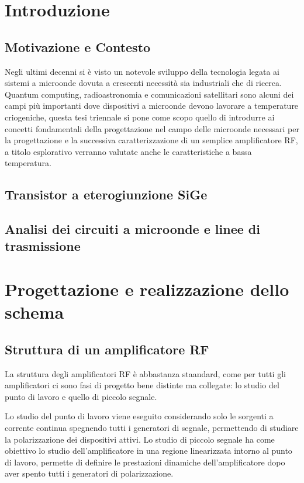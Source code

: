 \documentclass[12pt]{article}
\begin{document}
\section{Introduzione}
\subsection{Motivazione e Contesto}
Negli ultimi decenni si è visto un notevole sviluppo della tecnologia legata ai sistemi a microonde dovuta a crescenti necessità sia industriali che di ricerca.
Quantum computing, radioastronomia e comunicazioni satellitari sono alcuni dei campi più importanti dove dispositivi a microonde devono lavorare a temperature
criogeniche, questa tesi triennale si pone come scopo quello di introdurre ai concetti fondamentali della progettazione nel campo delle microonde necessari per
la progettazione e la successiva caratterizzazione di un semplice amplificatore RF, a titolo esplorativo verranno valutate anche le caratteristiche a bassa
temperatura.

\subsection{Transistor a eterogiunzione SiGe}
\subsection{Analisi dei circuiti a microonde e linee di trasmissione}
\section{Progettazione e realizzazione dello schema}
\subsection{Struttura di un amplificatore RF}
La struttura degli amplificatori RF è abbastanza staandard, come per tutti gli amplificatori ci sono fasi di progetto bene distinte ma collegate: lo studio del punto di lavoro e quello di piccolo segnale.

Lo studio del punto di lavoro viene eseguito considerando solo le sorgenti a corrente continua spegnendo tutti i generatori di segnale, permettendo di studiare la polarizzazione dei dispositivi attivi. Lo studio di piccolo segnale ha come obiettivo lo studio dell'amplificatore in una regione linearizzata intorno al punto di lavoro, permette di definire le prestazioni dinamiche dell'amplificatore dopo aver spento tutti i generatori di polarizzazione.
\end{document}
